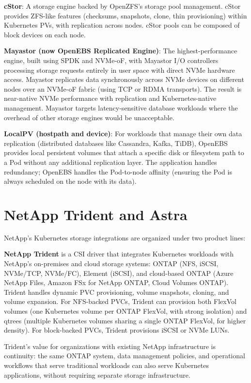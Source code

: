\textbf{cStor}: A storage engine backed by OpenZFS's storage pool management. cStor provides ZFS-like features (checksums, snapshots, clone, thin provisioning) within Kubernetes PVs, with replication across nodes. cStor pools can be composed of block devices on each node.

\textbf{Mayastor (now OpenEBS Replicated Engine)}: The highest-performance engine, built using SPDK and NVMe-oF, with Mayastor I/O controllers processing storage requests entirely in user space with direct NVMe hardware access. Mayastor replicates data synchronously across NVMe devices on different nodes over an NVMe-oF fabric (using TCP or RDMA transports). The result is near-native NVMe performance with replication and Kubernetes-native management. Mayastor targets latency-sensitive database workloads where the overhead of other storage engines would be unacceptable.

\textbf{LocalPV (hostpath and device)}: For workloads that manage their own data replication (distributed databases like Cassandra, Kafka, TiDB), OpenEBS provides local persistent volumes that attach a specific disk or filesystem path to a Pod without any additional replication layer. The application handles redundancy; OpenEBS handles the Pod-to-node affinity (ensuring the Pod is always scheduled on the node with its data).

\section{NetApp Trident and Astra}
NetApp's Kubernetes storage integrations are organized under two product lines:

\textbf{NetApp Trident} is a CSI driver that integrates Kubernetes workloads with NetApp's on-premises and cloud storage systems: ONTAP (NFS, iSCSI, NVMe/TCP, NVMe/FC), Element (iSCSI), and cloud-based ONTAP (Azure NetApp Files, Amazon FSx for NetApp ONTAP, Cloud Volumes ONTAP). Trident handles dynamic PVC provisioning, volume snapshots, cloning, and volume expansion. For NFS-backed PVCs, Trident can provision both FlexVol volumes (one Kubernetes volume per ONTAP FlexVol, with strong isolation) and qtrees (multiple Kubernetes volumes sharing a single ONTAP FlexVol, for higher density). For block-backed PVCs, Trident provisions iSCSI or NVMe LUNs.

Trident's value for organizations with existing NetApp infrastructure is continuity: the same ONTAP system, data management policies, and operational workflows that serve traditional workloads can also serve Kubernetes applications, without requiring separate storage infrastructure.

